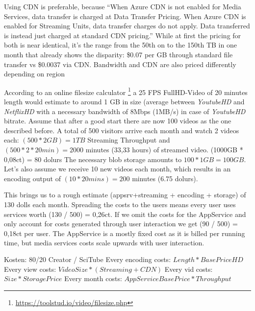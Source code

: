 Using CDN is preferable, because ``When Azure CDN is not enabled for Media Services, data transfer is charged at Data Transfer Pricing. When Azure CDN is enabled for Streaming Units, data transfer charges do not apply. Data transferred is instead just charged at standard CDN pricing.'' 
While at first the pricing for both is near identical, it's the range from the 50th on to the 150th TB in one month that already shows the disparity: \$0.07 per GB through standard file transfer vs  \$0.0037 via CDN.
Bandwidth and CDN are also priced differently depending on region

According to an online filesize calculator \footnote{\url{https://toolstud.io/video/filesize.php}} a 25 FPS FullHD-Video of 20 minutes length would estimate to around 1 GB in size (average between \textit{YoutubeHD} and \textit{NetflixHD} with a necessary bandwidth of 8Mbps (1MB/s) in case of \textit{YoutubeHD} bitrate.  %
Assume that after a good start there are now 100 videos as the one described before. A total of 500 visitors arrive each month and watch 2 videos each: $(500 \ast 2 GB) = 1TB$ Streaming Throughput and $(500 \ast 2 \ast 20 min)  = 2000$ minutes (33,33 hours) of streamed video. (1000GB * 0,08ct) = 80 dolurs
The necessary blob storage amounts to $100 \ast 1GB = 100GB$. 
Let's also assume we receive 10 new videos each month, which results in an encoding output of $(10 \ast 20 mins) = 200$ minutes (6.75 dolurs).  

This brings us to a rough estimate (appsrv+streaming + encoding + storage) of 130 dolls each month. Spreading the costs to the users means every user uses services worth (130 / 500) = 0,26ct. If we omit the costs for the AppService and only account for costs generated through user interaction we get (90 / 500) = 0,18ct per user. The AppService is a mostly fixed cost as it is billed per running time, but media services costs scale upwards with user interaction.

Kosten: 80/20 Creator / SciTube
Every encoding costs: $Length * BasePriceHD$
Every view costs: $VideoSize * (Streaming+CDN)$
Every vid costs: $Size * StoragePrice$
Every month costs: $AppServiceBasePrice * Throughput$
